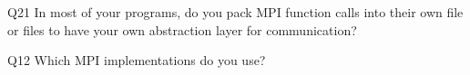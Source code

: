 \begin{description}%
\item{Q21} In most of your programs, do you pack MPI function calls into their own file or files to have your own abstraction layer for communication?%
\item{Q12} Which MPI implementations do you use?%
\end{description}%
